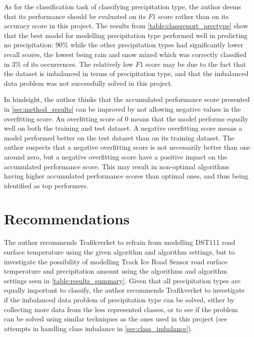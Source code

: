 	As for the classification task of classifying precipitation type, the author deems that its performance should be evaluated on its $F1$ score rather than on its accuracy score in this project. The results from \ref{table:classreport_prectype} show that the best model for modelling precipitation type performed well in predicting no precipitation: 90\% while the other precipitation types had significantly lower recall scores, the lowest being rain and snow mixed which was correctly classified in 3\% of its occurrences. The relatively low $F1$ score may be due to the fact that the dataset is imbalanced in terms of precipitation type, and that the imbalanced data problem was not successfully solved in this project. 

	In hindsight, the author thinks that the accumulated performance score presented in \ref{sec:method_results} can be improved by not allowing negative values in the overfitting score. An overfitting score of 0 means that the model performs equally well on both the training and test dataset. A negative overfitting score means a model performed better on the test dataset than on its training dataset. The author suspects that a negative overfitting score is not necessarily better than one around zero, but a negative overfitting score have a positive impact on the accumulated performance score. This may result in non-optimal algorithms having higher accumulated performance scores than optimal ones, and thus being identified as top performers.

\section{Recommendations}
		The author recommends Trafikverket to refrain from modelling DST111 road surface temperature using the given algorithm and algorithm settings, but to investigate the possibility of modelling Track Ice Road Sensor road surface temperature and precipitation amount using the algorithms and algorithm settings seen in \ref{table:results_summary}. Given that all precipitation types are equally important to classify, the author recommends Trafikverket to investigate if the imbalanced data problem of precipitation type can be solved, either by collecting more data from the less represented classes, or to see if the problem can be solved using similar techniques as the ones used in this project (see attempts in handling class imbalance in \ref{sec:class_imbalance}). 
